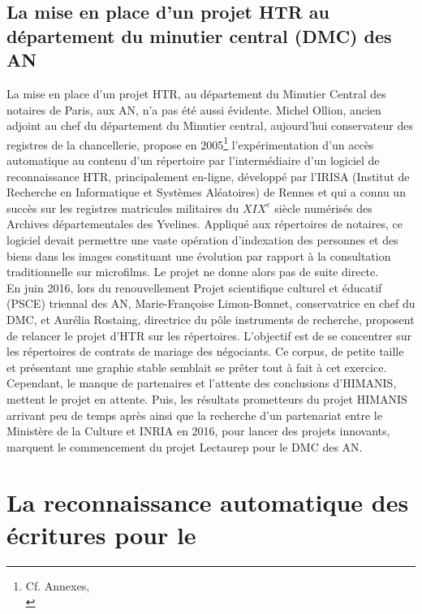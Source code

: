 \subsection{La mise en place d'un projet HTR au département du minutier central (DMC) des AN}

La mise en place d'un projet HTR, au département du Minutier Central des notaires de Paris, aux AN, n'a pas été aussi évidente. Michel Ollion, ancien adjoint au chef du département du Minutier central, aujourd'hui conservateur des registres de la chancellerie, propose en 2005\footnote{Cf. Annexes,\\ } l'expérimentation d'un accès automatique au contenu d'un répertoire par l'intermédiaire d'un logiciel de reconnaissance HTR, principalement en-ligne, développé par l'IRISA (Institut de Recherche en Informatique et Systèmes Aléatoires) de Rennes et qui a connu un succès sur les registres matricules militaires du $XIX^{e}$ siècle numérisés des Archives départementales des Yvelines. Appliqué aux répertoires de notaires, ce logiciel devait permettre une vaste opération d'indexation des personnes et des biens dans les images constituant une évolution par rapport à la consultation traditionnelle sur microfilms. Le projet ne donne alors pas de suite directe.\\

En juin 2016, lors du renouvellement Projet scientifique culturel et éducatif (PSCE) triennal des AN, Marie-Françoise Limon-Bonnet, conservatrice en chef du DMC, et Aurélia Rostaing, directrice du pôle instruments de recherche, proposent de relancer le projet d'HTR sur les répertoires. L'objectif est de se concentrer sur les répertoires de contrats de mariage des négociants. Ce corpus, de petite taille et présentant une graphie stable semblait se prêter tout à fait à cet exercice. Cependant, le manque de partenaires et l'attente des conclusions d'HIMANIS, mettent le projet en attente. Puis, les résultats prometteurs du projet HIMANIS arrivant peu de temps après ainsi que la recherche d'un partenariat entre le Ministère de la Culture et INRIA en 2016, pour lancer des projets innovants, marquent le commencement du projet Lectaurep pour le DMC des AN.
\newpage

\section{La reconnaissance automatique des écritures pour le }

